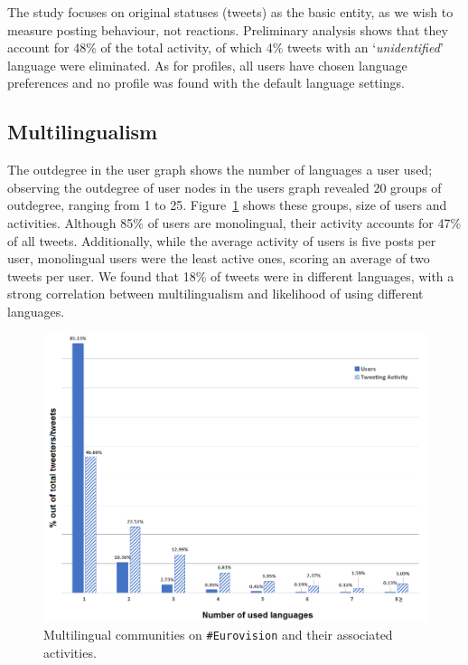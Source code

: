 \documentclass{llncs}
\begin{document}

The study focuses on original statuses (tweets) as the basic entity,
as we wish to measure posting behaviour, not reactions. Preliminary
analysis shows that they account for 48\% of the total activity, of
which 4\% tweets with an `{\emph{unidentified}}' language were
eliminated. As for profiles, all users have chosen language
preferences and no profile was found with the default language
settings.


\subsection{Multilingualism}

The outdegree in the user graph shows the number of languages a user
used; observing the outdegree of user nodes in the users graph revealed 20
groups of outdegree, ranging from 1 to
25. Figure~\ref{fig:multilingual} shows these groups, size of users
and activities. Although 85\% of users are monolingual, their
activity accounts for 47\% of all tweets. Additionally, while the
average activity of users is five posts per user, monolingual users
were the least active ones, scoring an average of two tweets per
user. We found that 18\% of tweets were in different languages, with a
strong correlation between multilingualism and likelihood of using
different languages.

\begin{figure}[htb]
\centering
\includegraphics[width=0.9\columnwidth]{images/multilingualcommunities.png}
\caption{Multilingual communities on {\texttt{\#Eurovision}} and their associated activities.}
\label{fig:multilingual}
\end{figure}
\end{document}
